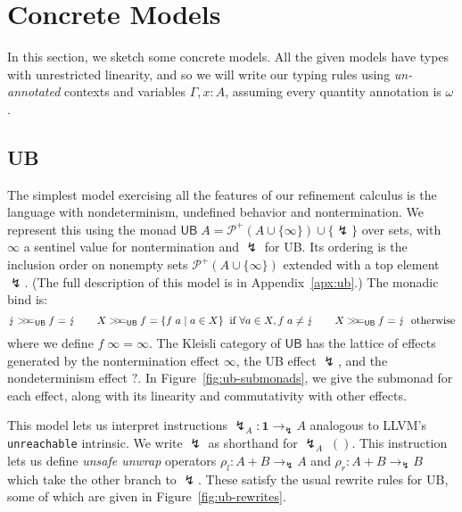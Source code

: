 \documentclass[acmsmall,screen,review]{acmart}
\newcommand{\mc}[1]{\ensuremath{\mathcal{#1}}}
\newcommand{\mb}[1]{\ensuremath{\mathbf{#1}}}
\newcommand{\ms}[1]{\ensuremath{\mathsf{#1}}}
\newcommand{\topq}{\omega}
\newcommand{\ubeff}{\lightning}
\newcommand{\obind}{\mathbin{>\!\!>\mkern-6.7mu=}}
\newcommand{\mbind}[3]{#2 \obind_{#1} #3}
\begin{document}
\section{Concrete Models}

In this section, we sketch some concrete models. All the given models have types with unrestricted
linearity, and so we will write our typing rules using \emph{un-annotated} contexts and variables
$\Gamma, x: A$, assuming every quantity annotation is $\topq$. 

\subsection{UB}

\label{ssec:ub}

The simplest model exercising all the features of our refinement calculus is the language with
nondeterminism, undefined behavior and nontermination. We represent this using the monad $\ms{UB}\;A
= \mc{P}^+(A \cup \{\infty\}) \cup \{\ubeff\}$ over sets, with $\infty$ a sentinel value for
nontermination and $\ubeff$ for UB. Its ordering is the inclusion order on nonempty sets $\mc{P}^+(A
\cup \{\infty\})$ extended with a top element $\ubeff$. (The full description of this model is in
Appendix~\ref{apx:ub}.) The monadic bind is:
$$
\mbind{\ms{UB}}{\ubeff}{f} = \ubeff \qquad
\mbind{\ms{UB}}{X}{f} = \{f\;a \mid a \in X\} \;\; \text{if } \forall a \in X, f\;a \neq \ubeff
\qquad
\mbind{\ms{UB}}{X}{f} = \ubeff \;\; \text{otherwise}
$$
where we define $f\;\infty = \infty$. 
%
The Kleisli category of $\ms{UB}$ has the lattice of effects generated by the nontermination effect
$\infty$, the UB effect $\ubeff$, and the nondeterminism effect $?$. In
Figure~\ref{fig:ub-submonads}, we give the submonad for each effect, along with its linearity and
commutativity with other effects.

This model lets us interpret instructions $\ubeff_A: \mb{1} \to_\ubeff A$ analogous to LLVM's
\texttt{unreachable} intrinsic. We write $\ubeff$ as shorthand for 
$\ubeff_A\;()$. This instruction lets us define \emph{unsafe unwrap} operators
$\rho_l : A + B \to_\ubeff A$ and $\rho_r : A + B \to_\ubeff B$
which take the other branch to $\ubeff$.
%
These satisfy the usual rewrite rules for UB, some of which are given in 
Figure~\ref{fig:ub-rewrites}.
\end{document}
